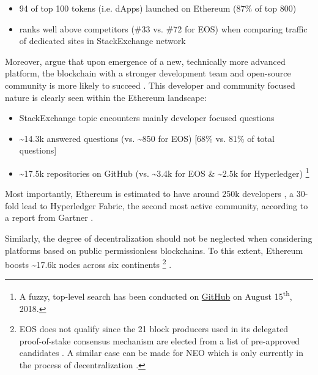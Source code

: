 \begin{itemize}
  \item 94 of top 100 tokens (i.e. \acp{dApp}) launched on Ethereum (87\% of top 800) \cite{coinmarketTop100Tokens} \cite{ethereumNetworkState}
  \item ranks well above competitors (\#33 vs. \#72 for EOS) when comparing traffic of dedicated sites in StackExchange network \cite{stackExchangeTechnology}
\end{itemize}

Moreover, \citeauthor{10.1371/journal.pone.0169556} argue that upon emergence of a new, technically more advanced platform, the blockchain with a stronger development team and open-source community is more likely to succeed \cite[p.~14]{10.1371/journal.pone.0169556}. This developer and community focused nature is clearly seen within the Ethereum landscape:

\begin{itemize}
  \item StackExchange topic encounters mainly developer focused questions \cite[p.~6]{blockchainTechnologyGrowth}
  \item \textasciitilde 14.3k answered questions (vs. \textasciitilde 850 for EOS) [68\% vs. 81\% of total questions] \cite{stackExchangeTechnology}
  \item \textasciitilde17.5k repositories on GitHub (vs. \textasciitilde3.4k for EOS \& \textasciitilde2.5k for Hyperledger)  \footnote{A fuzzy, top-level search has been conducted on \href{https://github.com/search?q=ethereum}{GitHub} on August 15\textsuperscript{th}, 2018.}
\end{itemize}

Most importantly, Ethereum is estimated to have around 250k developers \cite{ethereumNetworkState}, a 30-fold lead to Hyperledger Fabric, the second most active community, according to a report from Gartner \cite{bloomberg2017}. 

Similarly, the degree of decentralization should not be neglected when considering platforms based on public permissionless blockchains. To this extent, Ethereum boosts \textasciitilde17.6k nodes across six continents \footnote{EOS does not qualify since the 21 block producers used in its delegated proof-of-stake consensus mechanism are elected from a list of pre-approved candidates \cite[p.~6]{eosWhitepaper} \cite{eosBlockproducers}. A similar case can be made for NEO which is only currently in the process of decentralization \cite{neoDecentralization} \cite{neoConsensus}.} \cite{ethernodes}.  

